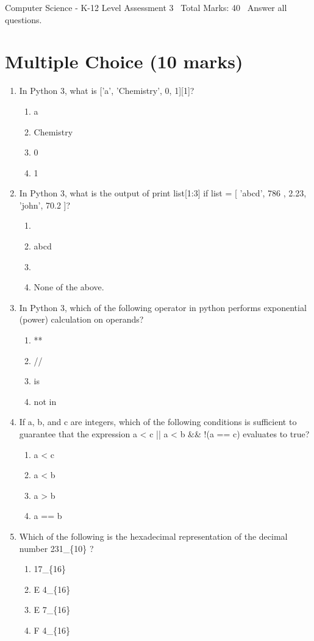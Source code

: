 \documentclass[12pt]{article}
\begin{document}
\begin{center}
Computer Science - K-12 Level Assessment 3 \
Total Marks: 40 \
Answer all questions.
\end{center}

\section*{Multiple Choice (10 marks)}
\begin{enumerate}[label=\arabic*.]
\item In Python 3, what is ['a', 'Chemistry', 0, 1][1]?
\begin{enumerate}[label=(\alph*)]
    \item a
    \item Chemistry
    \item 0
    \item 1
\end{enumerate}
\item In Python 3, what is the output of print list[1:3] if list = [ 'abcd', 786 , 2.23, 'john', 70.2 ]?
\begin{enumerate}[label=(\alph*)]
    \item [ 'abcd', 786 , 2.23, 'john', 70.2 ]
    \item abcd
    \item [786, 2.23]
    \item None of the above.
\end{enumerate}
\item In Python 3, which of the following operator in python performs exponential (power) calculation on operands?
\begin{enumerate}[label=(\alph*)]
    \item **
    \item //
    \item is
    \item not in
\end{enumerate}
\item If a, b, and c are integers, which of the following conditions is sufficient to guarantee that the expression a \textless{} c || a \textless{} b \&\& !(a == c) evaluates to true?
\begin{enumerate}[label=(\alph*)]
    \item a \textless{} c
    \item a \textless{} b
    \item a \textgreater{} b
    \item a == b
\end{enumerate}
\item Which of the following is the hexadecimal representation of the decimal number 231\_\{10\} ?
\begin{enumerate}[label=(\alph*)]
    \item 17\_\{16\}
    \item E 4\_\{16\}
    \item E 7\_\{16\}
    \item F 4\_\{16\}
\end{enumerate}
\end{enumerate}
\end{document}
